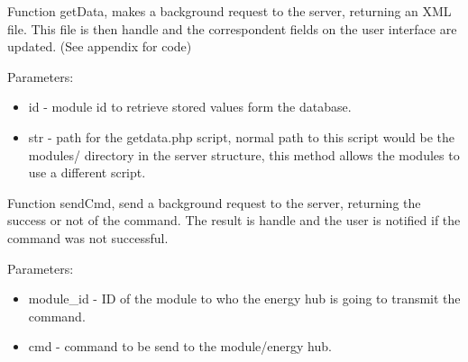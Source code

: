 Function getData, makes a background request to the server, returning an XML file. This file is then handle and the correspondent fields on the user interface are updated. (See appendix for code)

Parameters:
\begin{itemize}
	\item id - module id to retrieve stored values form the database.
	\item str - path for the getdata.php script, normal path to this script would be the modules/ directory in the server structure, this method allows the modules to use a different script.
\end{itemize}

Function sendCmd, send a background request to the server, returning the success or not of the command. The result is handle and the user is notified if the command was not successful. 

Parameters:
\begin{itemize}
	\item module\_id - ID of the module to who the energy hub is going to transmit the command.
	\item cmd - command to be send to the module/energy hub.
\end{itemize}